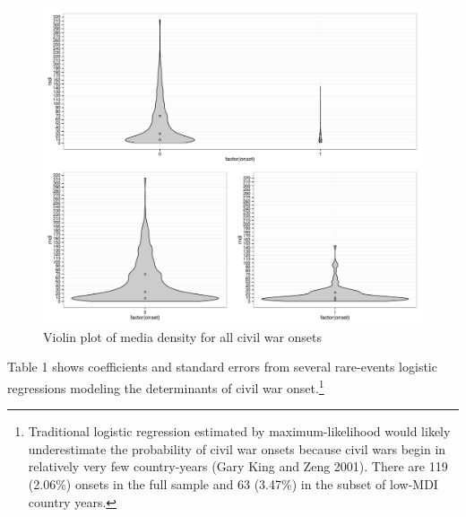 \documentclass[11pt,article,oneside]{memoir}
\makeatletter
\def\maxwidth{\ifdim\Gin@nat@width>\linewidth\linewidth
\else\Gin@nat@width\fi}
\let\Oldincludegraphics\includegraphics
\renewcommand{\includegraphics}[1]{\Oldincludegraphics[width=\maxwidth]{#1}}
\makeatother
\begin{document}
\begin{figure}[htbp]
\centering
\includegraphics{figure/violinplot.pdf}
\caption{Violin plot of media density for all civil war onsets}
\end{figure}

Table 1 shows coefficients and standard errors from several rare-events
logistic regressions modeling the determinants of civil war
onset.\footnote{Traditional logistic regression estimated by
  maximum-likelihood would likely underestimate the probability of civil
  war onsets because civil wars begin in relatively very few
  country-years (Gary King and Zeng 2001). There are 119 (2.06\%) onsets
  in the full sample and 63 (3.47\%) in the subset of low-MDI country
  years.}
\end{document}
